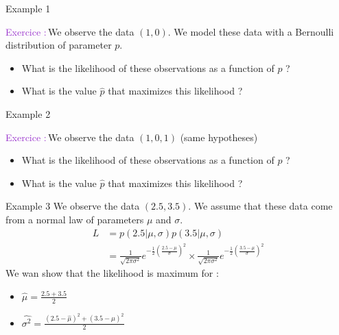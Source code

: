 \documentclass[usenames,dvipsnames]{beamer}
\newcounter{numexos}%
\newcommand{\exercice}[1]{%
\addtocounter{numexos}{1}%
\textcolor{DarkOrchid}{Exercice\,\thenumexos\,:}\,#1%
}
\begin{document}
\begin{frame}{Example 1}
    \exercice{We observe the data $(1,0)$. We model these data with a Bernoulli distribution of parameter $p$.
    \begin{itemize}
    	\item What is the likelihood of these observations as a function of $p$ ?}
	\item What is the value $\hat{p}$ that maximizes this likelihood ?
    \end{itemize}
\end{frame}

\begin{frame}{Example 2}
    \exercice{We observe the data $(1,0, 1)$ (same hypotheses)
    \begin{itemize}
    	\item What is the likelihood of these observations as a function of $p$ ?}
	\item What is the value $\hat{p}$ that maximizes this likelihood ?
    \end{itemize}
\end{frame}

\begin{frame}{Example 3}
    We observe the data $(2.5, 3.5)$. We assume that these data come from a normal law of parameters $\mu$ and $\sigma$.
    \begin{equation}
	\begin{aligned}
	    \label{eq:}
	    L &= p(2.5|\mu, \sigma)p(3.5|\mu,\sigma)\\
	    &= \frac{1}{ \sqrt{2\pi \sigma^2} } e^{ - \frac{1}{2} ( \frac{2.5-\mu}{\sigma}   )^2 }\times \frac{1}{ \sqrt{2\pi \sigma^2}  }e^{ - \frac{1}{2} ( \frac{3.5-\mu}{\sigma}   )^2 }
	\end{aligned}
    \end{equation}
    We wan show that the likelihood is maximum for : 
    \begin{itemize}
	\item $\hat{\mu}= \frac{2.5+3.5}{2} $
	\item $\hat{\sigma^2} = \frac{(2.5-\hat{\mu})^2+(3.5-\hat{\mu})^2}{2} $
    \end{itemize}
\end{frame}
\end{document}

